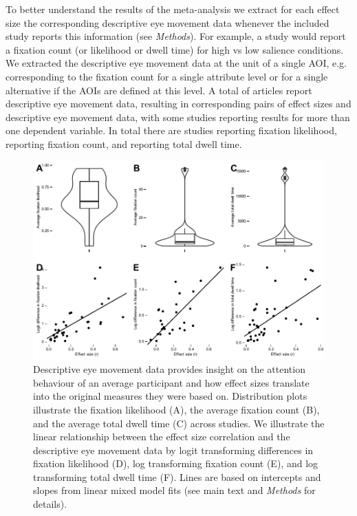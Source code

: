To better understand the results of the meta-analysis we extract for each effect size the corresponding descriptive eye movement data whenever the included study reports this information (see \textit{Methods}). For example, a study would report a fixation count (or likelihood or dwell time) for high vs low salience conditions. We extracted the descriptive eye movement data at the unit of a single AOI, e.g. corresponding to the fixation count for a single attribute level or for a single alternative if the AOIs are defined at this level. A total of  articles report descriptive eye movement data, resulting in  corresponding pairs of effect sizes and descriptive eye movement data, with some studies reporting results for more than one dependent variable. In total there are  studies reporting fixation likelihood,  reporting fixation count, and  reporting total dwell time.


\begin{figure}[!h]
\includegraphics{figs/EMtoES.pdf}
\centering
\caption{Descriptive eye movement data provides insight on the attention behaviour of an average participant and how effect sizes translate into the original measures they were based on. Distribution plots illustrate the fixation likelihood (A), the average fixation count (B), and the average total dwell time (C) across studies. We illustrate the linear relationship between the effect size correlation and the descriptive eye movement data by logit transforming differences in fixation likelihood (D), log transforming fixation count (E), and log transforming total dwell time (F). Lines are based on intercepts and slopes from linear mixed model fits (see main text and \textit{Methods} for details).}
\label{fig:em_figure}
\end{figure}


